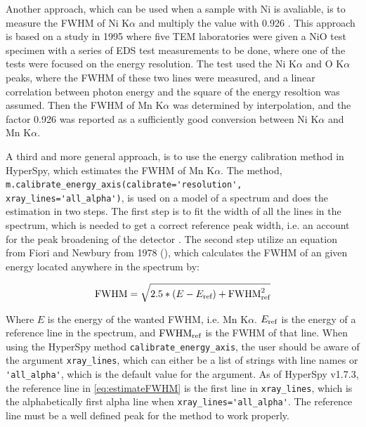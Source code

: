 Another approach, which can be used when a sample with Ni is avaliable, is to measure the FWHM of Ni K$\alpha$ and multiply the value with 0.926 \cite{bennett_egerton_1995}.
This approach is based on a study in 1995 where five TEM laboratories were given a NiO test specimen with a series of EDS test measurements to be done, where one of the tests were focused on the energy resolution.
The test used the Ni K$\alpha$ and O K$\alpha$ peaks, where the FWHM of these two lines were measured, and a linear correlation between photon energy and the square of the energy resoltion was assumed.
Then the FWHM of Mn K$\alpha$ was determined by interpolation, and the factor 0.926 was reported as a sufficiently good conversion between Ni K$\alpha$ and Mn K$\alpha$.


A third and more general approach, is to use the energy calibration method in HyperSpy, which estimates the FWHM of Mn K$\alpha$.
The method, \verb|m.calibrate_energy_axis(calibrate='resolution', xray_lines='all_alpha')|, is used on a model of a spectrum and does the estimation in two steps.
The first step is to fit the width of all the lines in the spectrum, which is needed to get a correct reference peak width, i.e. an account for the peak broadening of the detector .
The second step utilize an equation from Fiori and Newbury from 1978 (), which calculates the FWHM of an given energy located anywhere in the spectrum by:

\begin{equation}
    \label{eq:estimateFWHM}
    \textnormal{FWHM} =  \sqrt{2.5 * (E - E_\textnormal{ref}) + \textnormal{FWHM}^2_{\textnormal{ref}}}
\end{equation}

Where $E$ is the energy of the wanted FWHM, i.e. Mn K$\alpha$.
$E_\textnormal{ref}$ is the energy of a reference line in the spectrum, and $\textnormal{FWHM}_{\textnormal{ref}}$ is the FWHM of that line.
When using the HyperSpy method \verb|calibrate_energy_axis|, the user should be aware of the argument \verb|xray_lines|, which can either be a list of strings with line names or \verb|'all_alpha'|, which is the default value for the argument.
As of HyperSpy v1.7.3, the reference line in \cref{eq:estimateFWHM} is the first line in \verb|xray_lines|, which is the alphabetically first alpha line when \verb|xray_lines='all_alpha'|.
The reference line must be a well defined peak for the method to work properly.


